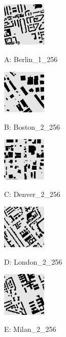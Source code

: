 \documentclass[lettersize,journal]{IEEEtran}
\begin{document}
\begin{figure}[t] \scriptsize
\begin{minipage}{.24\linewidth}
  \centerline{\includegraphics[width=2.1cm]{Berlin_1_256.png}}
  \centerline{A: Berlin\_1\_256}
\end{minipage}
\hfill
\begin{minipage}{.24\linewidth}
  \centerline{\includegraphics[width=2.1cm]{Boston_2_256.png}}
  \centerline{B: Boston\_2\_256}
\end{minipage}
\hfill
\begin{minipage}{.24\linewidth}
  \centerline{\includegraphics[width=2.1cm]{Denver_2_256.png}}
  \centerline{C: Denver\_2\_256}
\end{minipage}
\hfill
\begin{minipage}{.24\linewidth}
  \centerline{\includegraphics[width=2.1cm]{London_2_256.png}}
  \centerline{D: London\_2\_256}
\end{minipage}
\vfill
\vspace{0.2cm}
\begin{minipage}{.24\linewidth}
  \centerline{\includegraphics[width=2.1cm]{Milan_2_256.png}}
  \centerline{E: Milan\_2\_256}
\end{minipage}

\end{figure}
\end{document}

